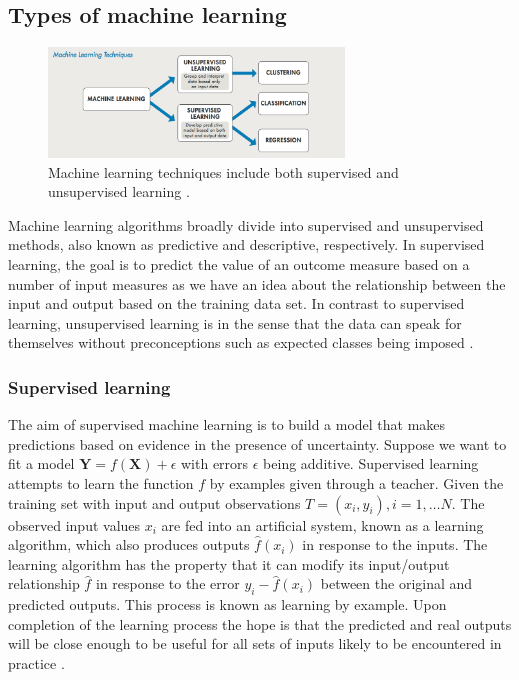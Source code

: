 \subsection{Types of machine learning}

\begin{figure}[H]
  \centering
    \includegraphics[width=0.7\textwidth]{images/Ml_techs.png}
    \caption{Machine learning techniques include both supervised and unsupervised learning \citep{Machinelearning}.}
  \label{sup-unsup}
\end{figure}

Machine learning algorithms broadly divide into supervised and unsupervised methods, also known as predictive and descriptive, respectively. In supervised learning, the goal is to predict the value of an outcome measure based on a number of input measures as we have an idea about the relationship between the input and output based on the training data set. In contrast to supervised learning, unsupervised learning is in the sense that the data can speak for themselves
without preconceptions such as expected classes being imposed \citep{ball2010data}. 

\subsubsection{Supervised learning}
The aim of supervised machine learning is to build a model
that makes predictions based on evidence in the presence of
uncertainty. Suppose  we want to fit a model $\textbf{Y}=f(\textbf{X})+\epsilon$ with errors $\epsilon$ being additive. Supervised learning attempts to learn the function $f$ by examples given through a teacher. Given the training set with input and output observations $T=(x_i,y_i ), i=1,\dots N$. The observed input values $x_i$ are fed into an artificial system, known as a learning algorithm, which also produces outputs $\widehat{f}(x_i)$ in response to the inputs. The learning algorithm has the property that it can modify its input/output relationship $\widehat{f}$ in response to the error $y_i- \widehat{f} (x_i)$ between the original and predicted outputs. This process is known as learning by example. Upon completion of the learning process the hope is that the predicted and real outputs will be close enough to be useful for all sets of inputs likely to be encountered in practice \citep{friedman2001elements}.

